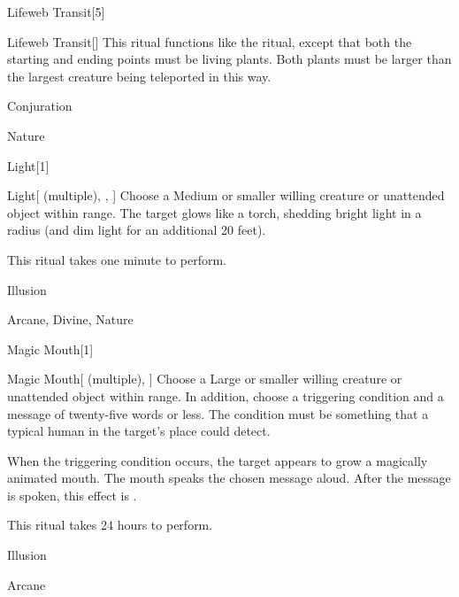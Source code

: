\begin{spellsection}{Lifeweb Transit}[5]


\begin{ability}{Lifeweb Transit}[]
This ritual functions like the  ritual, except that both the starting and ending points must be living plants.
Both plants must be larger than the largest creature being teleported in this way.
\end{ability}




 Conjuration

 Nature
\end{spellsection}


\begin{spellsection}{Light}[1]


\begin{ability}{Light}[ (multiple), , ]
Choose a Medium or smaller willing creature or unattended object within \rngclose range.
The target glows like a torch, shedding bright light in a \areamed radius (and dim light for an additional 20 feet).

This ritual takes one minute to perform.
\end{ability}




 Illusion

 Arcane, Divine, Nature
\end{spellsection}


\begin{spellsection}{Magic Mouth}[1]


\begin{ability}{Magic Mouth}[ (multiple), ]
Choose a Large or smaller willing creature or unattended object within \rngclose range.
In addition, choose a triggering condition and a message of twenty-five words or less.
The condition must be something that a typical human in the target's place could detect.

When the triggering condition occurs, the target appears to grow a magically animated mouth.
The mouth speaks the chosen message aloud.
After the message is spoken, this effect is .

This ritual takes 24 hours to perform.
\end{ability}




 Illusion

 Arcane
\end{spellsection}


